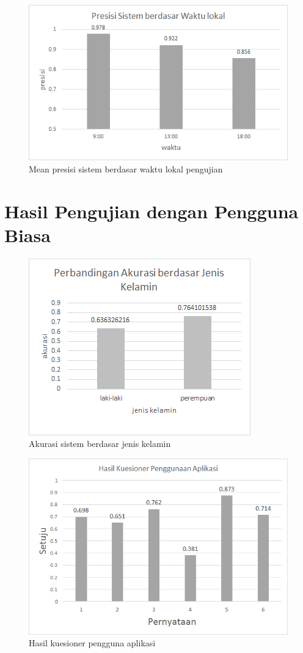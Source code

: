 \begin{figure}[h!]
    \centering
    \includegraphics[scale=0.7]{img/precision_time.png}
    \caption{Mean presisi sistem berdasar waktu lokal pengujian}
    \label{fig:p_time}
\end{figure}

\section{Hasil Pengujian dengan Pengguna Biasa}
\begin{figure}[h!]
    \centering
    \includegraphics[scale=1]{img/accuracy-gender.png}
    \caption{Akurasi sistem berdasar jenis kelamin}
    \label{fig:accuracy-gender}
\end{figure}

\begin{figure}[h!]
    \centering
    \includegraphics[scale=0.7]{img/hasil_kuesioner.png}
    \caption{Hasil kuesioner pengguna aplikasi}
    \label{fig:quest}
\end{figure}